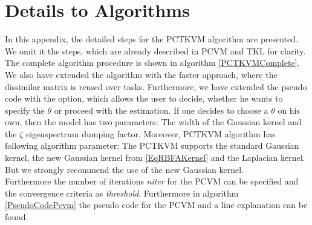 \chapter{Details to Algorithms}\label{appac}
In this appendix, the detailed steps for the \acs{PCTKVM} algorithm are presented.
We omit it the steps, which are already described in \acs{PCVM} and \acs{TKL} for clarity.
The complete algorithm procedure is shown in algorithm \ref{PCTKVMComplete}.\\
We also have extended the algorithm with the faster approach, where the dissimilar matrix is reused over tasks.
Furthermore, we have extended the pseudo code with the option, which allows the user to decide, whether he wants to specify the $\theta$ or proceed with the estimation.
If one decides to choose a $\theta$ on his own, then the model has two parameters: The width of the Gaussian kernel and the $\zeta$ eigenspectrum dumping factor.
Moreover, \acs{PCTKVM} algorithm has following algorithm parameter:
The \acs{PCTKVM} supports the standard Gaussian kernel, the new Gaussian kernel from \eqref{EqRBFAKernel} and the Laplacian kernel. But we strongly recommend the use of the new Gaussian kernel.\\
Furthermore the number of iterations \textit{niter} for the \acs{PCVM} can be specified and the convergence criteria as \textit{threshold}.
Furthermore in algorithm \ref{PseudoCodePcvm} the pseudo code for the \acs{PCVM} and a line explanation can be found.

